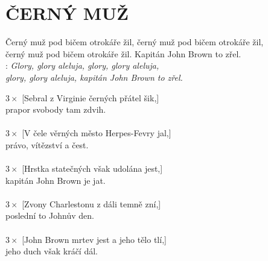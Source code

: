 \section*{\Huge ČERNÝ MUŽ}

Černý muž pod bičem otrokáře žil, černý muž pod bičem otrokáře žil,\\
černý muž pod bičem otrokáře žil. Kapitán John Brown to zřel.\\
 
\textregistered:
\emph{
Glory, glory aleluja, glory, glory aleluja,\\
glory, glory aleluja, kapitán John Brown to zřel.\\
}

$3\times$ [Sebral z Virginie černých přátel šik,]\\
prapor svobody tam zdvih.\\
\textregistered\\

$3\times$ [V čele věrných město Herpes-Fevry jal,]\\
právo, vítězství a čest.\\
\textregistered\\

$3\times$ [Hrstka statečných však udolána jest,]\\
kapitán John Brown je jat.\\
\textregistered\\

$3\times$ [Zvony Charlestonu z dáli temně zní,]\\
poslední to Johnův den.\\
\textregistered\\

$3\times$ [John Brown mrtev jest a jeho tělo tlí,]\\
jeho duch však kráčí dál.\\
\textregistered

\newpage

